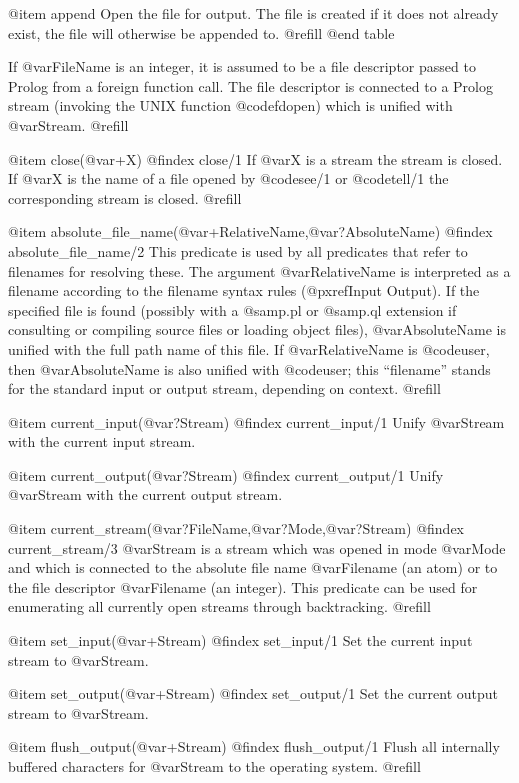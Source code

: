 @item append
Open the file for output.  The file is created if it does not already exist,
the file will otherwise be appended to. @refill
@end table

If @var{FileName} is an integer, it is assumed to be a file descriptor
passed to Prolog from a foreign function call.  The file descriptor is
connected to a Prolog stream (invoking the UNIX function @code{fdopen})
which is unified with @var{Stream}.  @refill

@item close(@var{+X})
@findex close/1
If @var{X} is a stream the stream is closed.  If @var{X} is the name of
a file opened by @code{see/1} or @code{tell/1} the corresponding stream
is closed.  @refill

@item absolute_file_name(@var{+RelativeName},@var{?AbsoluteName})
@findex absolute_file_name/2
This predicate is used by all predicates that refer to filenames for
resolving these.  The argument @var{RelativeName} is interpreted as a
filename according to the filename syntax rules (@pxref{Input Output}).
If the specified file is found (possibly with a @samp{.pl} or @samp{.ql}
extension if consulting or compiling source files or loading object
files), @var{AbsoluteName} is unified with the full path name of this
file.  If @var{RelativeName} is @code{user}, then @var{AbsoluteName} is
also unified with @code{user}; this ``filename'' stands for the standard
input or output stream, depending on context.
@refill

@item current_input(@var{?Stream})
@findex current_input/1
Unify @var{Stream} with the current input stream.

@item current_output(@var{?Stream})
@findex current_output/1
Unify @var{Stream} with the current output stream.

@item current_stream(@var{?FileName},@var{?Mode},@var{?Stream})
@findex current_stream/3
@var{Stream} is a stream which was opened in mode @var{Mode} and which
is connected to the absolute file name @var{Filename} (an atom) or to
the file descriptor @var{Filename} (an integer).  This predicate can be
used for enumerating all currently open streams through backtracking.
@refill

@item set_input(@var{+Stream})
@findex set_input/1
Set the current input stream to @var{Stream}.

@item set_output(@var{+Stream})
@findex set_output/1
Set the current output stream to @var{Stream}.

@item flush_output(@var{+Stream})
@findex flush_output/1
Flush all internally buffered characters for @var{Stream} to the
operating system. @refill

